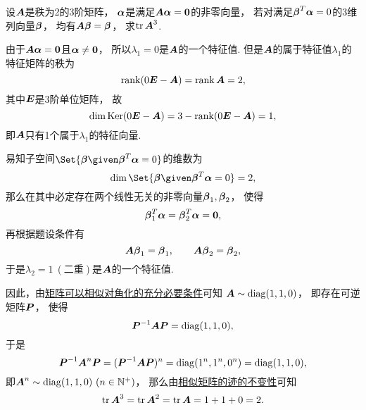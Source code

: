 \begin{example}
设\(\boldsymbol{A}\)是秩为2的3阶矩阵，
\(\boldsymbol\alpha\)是满足\(\boldsymbol{A} \boldsymbol\alpha = \boldsymbol0\)的非零向量，
若对满足\(\boldsymbol\beta^T \boldsymbol\alpha = 0\)的3维列向量\(\boldsymbol\beta\)，
均有\(\boldsymbol{A} \boldsymbol\beta = \boldsymbol\beta\)，
求\(\tr\boldsymbol{A}^3\).
\begin{solution}
由于\(\boldsymbol{A} \boldsymbol\alpha = \boldsymbol0\)且\(\boldsymbol\alpha \neq \boldsymbol0\)，
所以\(\lambda_1 = 0\)是\(\boldsymbol{A}\)的一个特征值.
但是\(\boldsymbol{A}\)的属于特征值\(\lambda_1\)的特征矩阵的秩为\[
	\rank(0\boldsymbol{E}-\boldsymbol{A})
	= \rank\boldsymbol{A}
	= 2,
\]
其中\(\boldsymbol{E}\)是3阶单位矩阵，
故\[
	\dim\operatorname{Ker}(0\boldsymbol{E}-\boldsymbol{A})
	= 3 - \rank(0\boldsymbol{E}-\boldsymbol{A})
	= 1,
\]
即\(\boldsymbol{A}\)只有1个属于\(\lambda_1\)的特征向量.

易知子空间\(\Set{\vb\beta \given \vb\beta^T \vb\alpha = 0}\)的维数为\[
	\dim\Set{\vb\beta \given \vb\beta^T \vb\alpha = 0} = 2,
\]
那么在其中必定存在两个线性无关的非零向量\(\boldsymbol\beta_1,\boldsymbol\beta_2\)，
使得\begin{equation*}
	\boldsymbol\beta_1^T \boldsymbol\alpha
	= \boldsymbol\beta_2^T \boldsymbol\alpha
	= \boldsymbol0,
\end{equation*}
再根据题设条件有\[
	\boldsymbol{A}\boldsymbol\beta_1 = \boldsymbol\beta_1,
	\qquad
	\boldsymbol{A}\boldsymbol\beta_2 = \boldsymbol\beta_2,
\]
于是\(\lambda_2 = 1\ (\text{二重})\)是\(\boldsymbol{A}\)的一个特征值.

因此，由\hyperref[theorem:矩阵相似对角化.矩阵可以相似对角化的充分必要条件]{矩阵可以相似对角化的充分必要条件}可知
\(\boldsymbol{A} \sim \operatorname{diag}(1,1,0)\)，
即存在可逆矩阵\(\boldsymbol{P}\)，
使得\[
	\boldsymbol{P}^{-1} \boldsymbol{A} \boldsymbol{P}
	= \operatorname{diag}(1,1,0),
\]
于是\[
	\boldsymbol{P}^{-1} \boldsymbol{A}^n \boldsymbol{P}
	= (\boldsymbol{P}^{-1} \boldsymbol{A} \boldsymbol{P})^n
	= \operatorname{diag}(1^n,1^n,0^n)
	= \operatorname{diag}(1,1,0),
\]
即\(\boldsymbol{A}^n \sim \operatorname{diag}(1,1,0)\ (n\in\mathbb{N}^+)\)，
那么由\hyperref[theorem:特征值与特征向量.相似矩阵的迹的不变性]{相似矩阵的迹的不变性}可知\[
	\tr\boldsymbol{A}^3
	= \tr\boldsymbol{A}^2
	= \tr\boldsymbol{A}
	= 1+1+0
	= 2.
\]
\end{solution}
\end{example}

